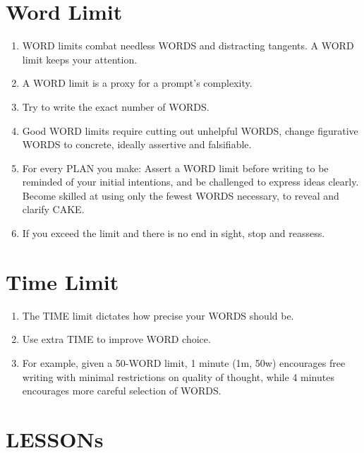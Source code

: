 \documentclass[
]{book}
\providecommand{\tightlist}{%
  \setlength{\itemsep}{0pt}\setlength{\parskip}{0pt}}
\begin{document}
\hypertarget{word-limit}{%
\section{Word Limit}\label{word-limit}}

\begin{enumerate}
\def\labelenumi{\arabic{enumi}.}
\setcounter{enumi}{23}
\tightlist
\item
  WORD limits combat needless WORDS and distracting tangents. A WORD limit keeps your attention.
\item
  A WORD limit is a proxy for a prompt's complexity.
\item
  Try to write the exact number of WORDS.
\item
  Good WORD limits require cutting out unhelpful WORDS, change figurative WORDS to concrete, ideally assertive and falsifiable.
\item
  For every PLAN you make: Assert a WORD limit before writing to be reminded of your initial intentions, and be challenged to express ideas clearly. Become skilled at using only the fewest WORDS necessary, to reveal and clarify CAKE.
\item
  If you exceed the limit and there is no end in sight, stop and reassess.
\end{enumerate}

\hypertarget{time-limit}{%
\section{Time Limit}\label{time-limit}}

\begin{enumerate}
\def\labelenumi{\arabic{enumi}.}
\setcounter{enumi}{29}
\tightlist
\item
  The TIME limit dictates how precise your WORDS should be.
\item
  Use extra TIME to improve WORD choice.
\item
  For example, given a 50-WORD limit, 1 minute (1m, 50w) encourages free writing with minimal restrictions on quality of thought, while 4 minutes encourages more careful selection of WORDS.
\end{enumerate}

\hypertarget{lessons-1}{%
\section{LESSONs}\label{lessons-1}}
\end{document}

